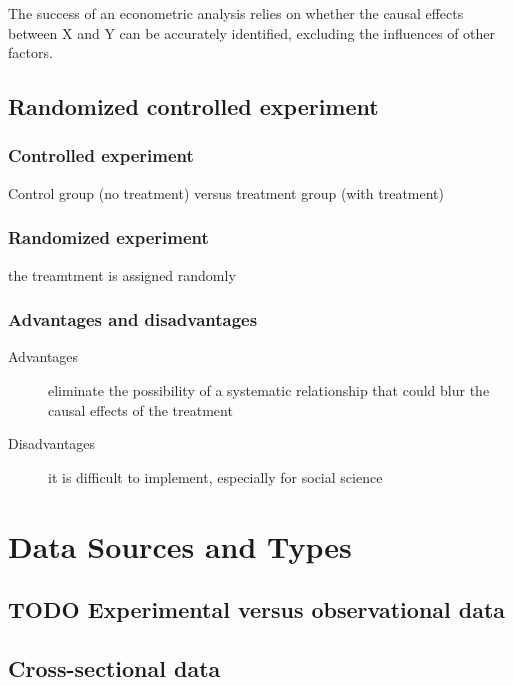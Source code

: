 \documentclass[a4paper,11pt]{article}
\begin{document}
The success of an econometric analysis relies on whether the causal
effects between X and Y can be accurately identified, excluding the
influences of other factors.

\subsection{Randomized controlled experiment}
\label{sec:org1bdc749}

\subsubsection*{Controlled experiment}
\label{sec:org12efdd8}

Control group (no treatment) versus treatment group (with treatment)

\subsubsection*{Randomized experiment}
\label{sec:org51b68ff}
the treamtment is assigned randomly

\subsubsection*{Advantages and disadvantages}
\label{sec:org656204c}

\begin{description}
\item[{Advantages}] eliminate the possibility of a systematic relationship that could
blur the causal effects of the treatment

\item[{Disadvantages}] it is difficult to implement, especially for social
science
\end{description}


\section{Data Sources and Types}
\label{sec:orgf4364ca}
\subsection{{\bfseries\sffamily TODO} Experimental versus observational data}
\label{sec:org04c3a96}

\subsection{Cross-sectional data}
\label{sec:org21cdc25}
\end{document}
